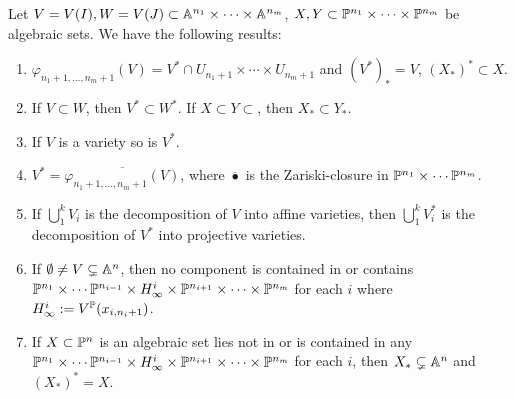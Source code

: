        \begin{lemma}\label{Multiprojectiveclosure}
        Let $V=V(I),W=V(J)\subset \mathbb{A}^{n_1}\times \cdots \times \mathbb{A}^{n_m}$, $X,Y\subset \mathbb{P}^{n_1}\times\cdots\times\mathbb{P}^{n_m}$ be algebraic sets. We have the following results:
        \begin{enumerate}
            \item $\varphi_{n_1+1,\dots,n_m+1}(V)= V^\ast\cap U_{n_1+1}\times\cdots\times U_{n_m+1}$ and $(V^\ast)_\ast=V$, $(X_\ast)^\ast \subset X$.
            \item If $V\subset W$, then $V^\ast \subset W^\ast$. If $X\subset Y\subset $, then $X_\ast \subset Y_\ast$.
            \item If $V$ is a variety so is $V^\ast$.
            \item $V^\ast = \overline{\varphi_{n_1+1,\dots,n_m+1}(V)}$, where $\overline{\bullet}$ is the Zariski-closure in $\mathbb{P}^{n_1}\times \cdots \mathbb{P}^{n_m}$.
            \item If $\bigcup_1^k V_i$ is the decomposition of $V$ into affine varieties, then $\bigcup_1^k V_i^\ast$ is the decomposition of $V^\ast$ into projective varieties.
            \item If $\emptyset \neq V \subsetneq \mathbb{A}^n$, then no component is contained in or contains $\mathbb{P}^{n_1}\times\cdots\mathbb{P}^{n_{i-1}}\times H^i_\infty\times\mathbb{P}^{n_{i+1}}\times\cdots\times\mathbb{P}^{n_m}$ for each $i$ where $H^i_\infty := V^{\mathbb{P}}(x_{i,n_i+1})$.
            \item If $X\subset \mathbb{P}^n$ is an algebraic set lies not in or is contained in any $\mathbb{P}^{n_1}\times\cdots\mathbb{P}^{n_{i-1}}\times H^i_\infty\times\mathbb{P}^{n_{i+1}}\times\cdots\times\mathbb{P}^{n_m}$ for each $i$, then $X_\ast \subsetneq \mathbb{A}^n$ and $(X_\ast)^\ast = X$.
        \end{enumerate}
    \end{lemma}
